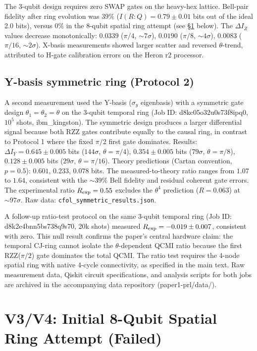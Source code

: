 \documentclass[aps,prl,showpacs]{revtex4-2}
\begin{document}
The 3-qubit design requires zero SWAP gates on the heavy-hex lattice. Bell-pair fidelity after ring evolution was $39\%$ ($I(R:Q)=0.79\pm0.01$ bits out of the ideal 2.0 bits), versus $0\%$ in the 8-qubit spatial ring attempt (see \S\ref{sec:v3v4} below). The $\Delta I_Z$ values decrease monotonically: $0.0339$ ($\pi/4$, $\sim7\sigma$), $0.0190$ ($\pi/8$, $\sim4\sigma$), $0.0083$ ($\pi/16$, $\sim2\sigma$). X-basis measurements showed larger scatter and reversed $\theta$-trend, attributed to H-gate calibration errors on the Heron r2 processor.

\subsection{Y-basis symmetric ring (Protocol 2)}

A second measurement used the Y-basis ($\sigma_y$ eigenbasis) with a symmetric gate design $\theta_1=\theta_2=\theta$ on the 3-qubit temporal ring (Job ID: d8kc05o32u0s73f8ipq0, $10^5$ shots, ibm\_kingston). The symmetric design produces a larger differential signal because both RZZ gates contribute equally to the causal ring, in contrast to Protocol 1 where the fixed $\pi/2$ first gate dominates. Results: $\Delta I_Y = 0.645 \pm 0.005$ bits ($144\sigma$, $\theta=\pi/4$), $0.354 \pm 0.005$ bits ($79\sigma$, $\theta=\pi/8$), $0.128 \pm 0.005$ bits ($29\sigma$, $\theta=\pi/16$). Theory predictions (Cartan convention, $p=0.5$): $0.601$, $0.233$, $0.078$ bits. The measured-to-theory ratio ranges from $1.07$ to $1.64$, consistent with the $\sim39\%$ Bell fidelity and residual coherent gate errors. The experimental ratio $R_{\rm exp}=0.55$ excludes the $\theta^4$ prediction ($R=0.063$) at ${\sim}97\sigma$. Raw data: \texttt{cfol\_symmetric\_results.json}.

A follow-up ratio-test protocol on the same 3-qubit temporal ring (Job ID: d8k2e4bnn5bs738q9s70, 20k shots) measured $R_{\rm exp} = -0.019 \pm 0.007$, consistent with zero. This null result confirms the paper's central hardware claim: the temporal CJ-ring cannot isolate the $\theta$-dependent QCMI ratio because the first RZZ($\pi/2$) gate dominates the total QCMI. The ratio test requires the 4-node spatial ring with native 4-cycle connectivity, as specified in the main text. Raw measurement data, Qiskit circuit specifications, and analysis scripts for both jobs are archived in the accompanying data repository (paper1-prl/data/).


\section{V3/V4: Initial 8-Qubit Spatial Ring Attempt (Failed)}
\label{sec:v3v4}
\end{document}
